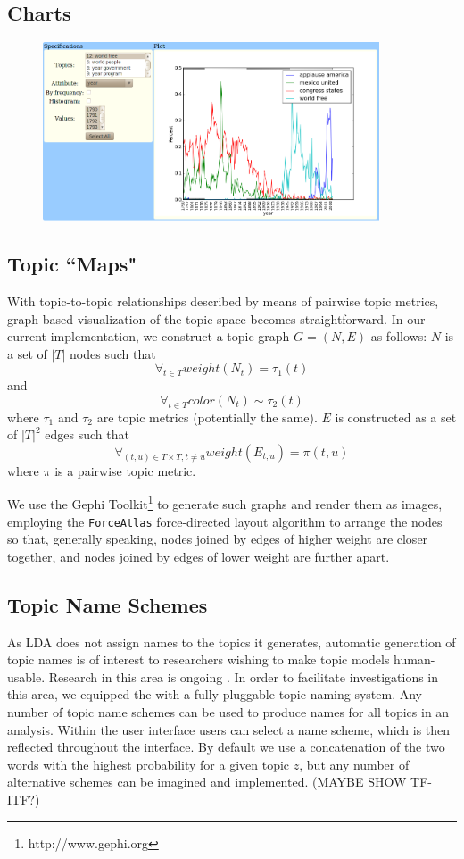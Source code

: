 \documentclass[11pt]{article}
\begin{document}
\subsection{Charts}

\begin{figure}[t]
 \centering
 \includegraphics[height=200px,keepaspectratio=true]{./topics_vs_years.png}
 \label{fig:chart}
 \caption{}
\end{figure}


\subsection{Topic ``Maps"}
With topic-to-topic relationships described by means of pairwise topic metrics,
graph-based visualization of the topic space becomes straightforward. In our
current implementation, we construct a topic graph $G = (N, E)$ as follows:
$N$ is a set of $|T|$ nodes such that
\[\forall_{t\in T} weight(N_{t}) = \tau_{1}(t)\]
and
\[\forall_{t\in T} color(N_{t}) \sim \tau_{2}(t)\]
where $\tau_1$ and $\tau_2$ are topic metrics (potentially the same). $E$ is
constructed as a set of $|T|^2$ edges such that
  \[\forall_{(t,u)\in T\times T, t\neq u} weight(E_{t,u}) = \pi(t,u)\]
where $\pi$ is a pairwise topic metric.

We use the Gephi Toolkit\footnote{http://www.gephi.org} to generate such graphs
and render them as images, employing the \texttt{ForceAtlas} force-directed
layout algorithm to arrange the nodes so that, generally speaking, nodes joined
by edges of higher weight are closer together, and nodes joined by edges of
lower weight are further apart.


\subsection{Topic Name Schemes}
As LDA does not assign names to the topics it generates, automatic generation of
topic names is of interest to researchers wishing to make topic models
human-usable. Research in this area is ongoing \cite{Mei2007,Lau2010}. In order to
facilitate investigations in this area, we equipped the \toolname{} with a
fully pluggable topic naming system. Any number of topic name schemes can be
used to produce names for all topics in an analysis. Within the user interface
users can select a name scheme, which is then reflected throughout the
interface. By default we use a concatenation of the two
words with the highest probability for a given topic $z$, but any number of
alternative schemes can be imagined and implemented. (MAYBE SHOW TF-ITF?)
\end{document}
